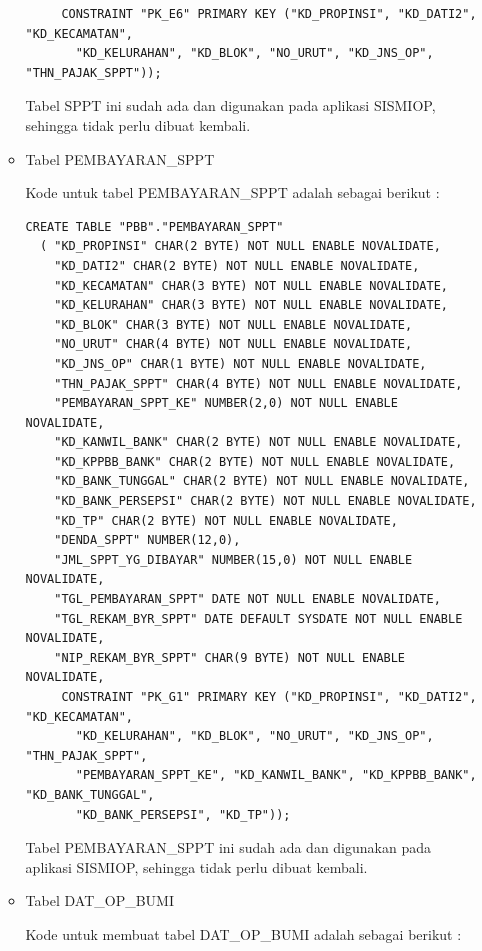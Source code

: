 \documentclass[pdftex,12pt, oneside]{article}
\begin{document}
\begin{enumerate}[1.]
\begin{itemize}
\begin{lstlisting}
	 CONSTRAINT "PK_E6" PRIMARY KEY ("KD_PROPINSI", "KD_DATI2", "KD_KECAMATAN",    
	   "KD_KELURAHAN", "KD_BLOK", "NO_URUT", "KD_JNS_OP", "THN_PAJAK_SPPT"));
	\end{lstlisting}
	
	Tabel SPPT ini sudah ada dan digunakan pada aplikasi SISMIOP, sehingga tidak perlu dibuat kembali.
	
	\item Tabel PEMBAYARAN\_SPPT
	
	Kode untuk tabel PEMBAYARAN\_SPPT adalah sebagai berikut :
	
\begin{lstlisting}
CREATE TABLE "PBB"."PEMBAYARAN_SPPT" 
  (	"KD_PROPINSI" CHAR(2 BYTE) NOT NULL ENABLE NOVALIDATE, 
	"KD_DATI2" CHAR(2 BYTE) NOT NULL ENABLE NOVALIDATE, 
	"KD_KECAMATAN" CHAR(3 BYTE) NOT NULL ENABLE NOVALIDATE, 
	"KD_KELURAHAN" CHAR(3 BYTE) NOT NULL ENABLE NOVALIDATE, 
	"KD_BLOK" CHAR(3 BYTE) NOT NULL ENABLE NOVALIDATE, 
	"NO_URUT" CHAR(4 BYTE) NOT NULL ENABLE NOVALIDATE, 
	"KD_JNS_OP" CHAR(1 BYTE) NOT NULL ENABLE NOVALIDATE, 
	"THN_PAJAK_SPPT" CHAR(4 BYTE) NOT NULL ENABLE NOVALIDATE, 
	"PEMBAYARAN_SPPT_KE" NUMBER(2,0) NOT NULL ENABLE NOVALIDATE, 
	"KD_KANWIL_BANK" CHAR(2 BYTE) NOT NULL ENABLE NOVALIDATE, 
	"KD_KPPBB_BANK" CHAR(2 BYTE) NOT NULL ENABLE NOVALIDATE, 
	"KD_BANK_TUNGGAL" CHAR(2 BYTE) NOT NULL ENABLE NOVALIDATE, 
	"KD_BANK_PERSEPSI" CHAR(2 BYTE) NOT NULL ENABLE NOVALIDATE, 
	"KD_TP" CHAR(2 BYTE) NOT NULL ENABLE NOVALIDATE, 
	"DENDA_SPPT" NUMBER(12,0), 
	"JML_SPPT_YG_DIBAYAR" NUMBER(15,0) NOT NULL ENABLE NOVALIDATE, 
	"TGL_PEMBAYARAN_SPPT" DATE NOT NULL ENABLE NOVALIDATE, 
	"TGL_REKAM_BYR_SPPT" DATE DEFAULT SYSDATE NOT NULL ENABLE NOVALIDATE, 
	"NIP_REKAM_BYR_SPPT" CHAR(9 BYTE) NOT NULL ENABLE NOVALIDATE, 
	 CONSTRAINT "PK_G1" PRIMARY KEY ("KD_PROPINSI", "KD_DATI2", "KD_KECAMATAN", 
	   "KD_KELURAHAN", "KD_BLOK", "NO_URUT", "KD_JNS_OP", "THN_PAJAK_SPPT", 
	   "PEMBAYARAN_SPPT_KE", "KD_KANWIL_BANK", "KD_KPPBB_BANK", "KD_BANK_TUNGGAL", 
	   "KD_BANK_PERSEPSI", "KD_TP"));
\end{lstlisting}

	Tabel PEMBAYARAN\_SPPT ini sudah ada dan digunakan pada aplikasi SISMIOP, sehingga tidak perlu dibuat kembali.
	
	\item Tabel DAT\_OP\_BUMI
	
	Kode untuk membuat tabel DAT\_OP\_BUMI adalah sebagai berikut :
	

\end{itemize}
\end{enumerate}
\end{document}
